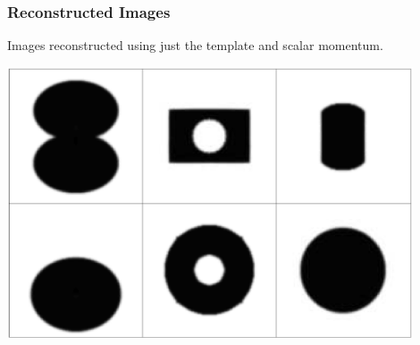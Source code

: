 \begin{frame}
\frametitle{Reconstructed Images}
Images reconstructed using just the template and scalar momentum.
\begin{center}
\includegraphics[width=0.9\textwidth]{reconstructed}
\end{center}
\end{frame}



